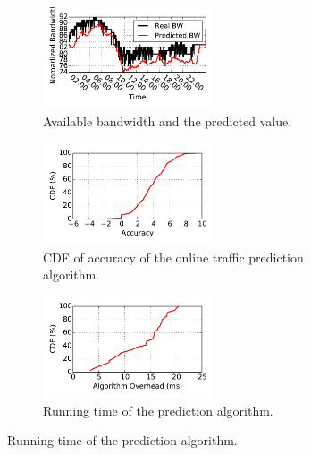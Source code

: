 \begin{figure}[t]
        \centering
        \begin{subfigure}[b]{0.3\textwidth}
                \centering
                \includegraphics[width=50mm]{images/real_bw_and_estimate_bw.pdf}
                \caption{Available bandwidth and the predicted value.}
                \label{fig:pred:real}
        \end{subfigure}
        \begin{subfigure}[b]{0.3\textwidth}
                \centering
                \includegraphics[width=50mm]{images/bw_prediction_accuracy.pdf}
                \caption{CDF of accuracy of the online traffic prediction algorithm.}
                \label{fig:pred:accurancy}
        \end{subfigure}
        \begin{subfigure}[b]{0.3\textwidth}
                \centering
                \includegraphics[width=50mm]{images/alg_overhead.pdf}
                \caption{Running time of the prediction algorithm.}
                \label{fig:pred:overhead}
        \end{subfigure}
        \label{fig:pred}
\end{figure}

